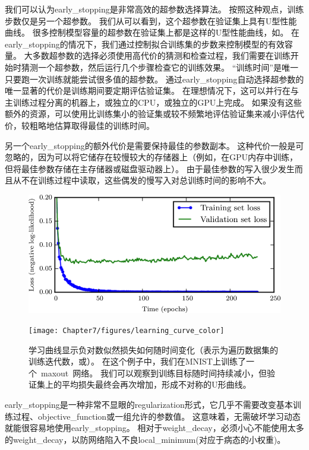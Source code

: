 我们可以认为\gls{early_stopping}是非常高效的超参数选择算法。
按照这种观点，训练步数仅是另一个超参数。
我们从可以看到，这个超参数在验证集上具有U型性能曲线。
很多控制模型容量的超参数在验证集上都是这样的U型性能曲线，如。
在\gls{early_stopping}的情况下，我们通过控制拟合训练集的步数来控制模型的有效容量。
大多数超参数的选择必须使用高代价的猜测和检查过程，我们需要在训练开始时猜测一个超参数，然后运行几个步骤检查它的训练效果。
``训练时间''是唯一只要跑一次训练就能尝试很多值的超参数。
通过\gls{early_stopping}自动选择超参数的唯一显著的代价是训练期间要定期评估验证集。
在理想情况下，这可以并行在与主训练过程分离的机器上，或独立的CPU，或独立的GPU上完成。
如果没有这些额外的资源，可以使用比训练集小的验证集或较不频繁地评估验证集来减小评估代价，较粗略地估算取得最佳的训练时间。

另一个\gls{early_stopping}的额外代价是需要保持最佳的参数副本。
这种代价一般是可忽略的，因为可以将它储存在较慢较大的存储器上（例如，在GPU内存中训练，但将最佳参数存储在主存储器或磁盘驱动器上）。
由于最佳参数的写入很少发生而且从不在训练过程中读取，这些偶发的慢写入对总训练时间的影响不大。

\begin{figure}[!htb]
\ifOpenSource
\centerline{\includegraphics[scale=0.5]{images/56.png}}
\else
\centerline{\texttt{[image: Chapter7/figures/learning\_curve\_color]}}
\fi
\caption{学习曲线显示负对数似然损失如何随时间变化（表示为遍历数据集的训练迭代数，或）。
在这个例子中，我们在MNIST上训练了一个~\gls{maxout}~网络。
我们可以观察到训练目标随时间持续减小，但验证集上的平均损失最终会再次增加，形成不对称的U形曲线。
}
\label{fig:chap7_learning_curve}
\end{figure}


\gls{early_stopping}是一种非常不显眼的\gls{regularization}形式，它几乎不需要改变基本训练过程、\gls{objective_function}或一组允许的参数值。
这意味着，无需破坏学习动态就能很容易地使用\gls{early_stopping}。
相对于\gls{weight_decay}，必须小心不能使用太多的\gls{weight_decay}，以防网络陷入不良\gls{local_minimum}(对应于病态的小权重)。

